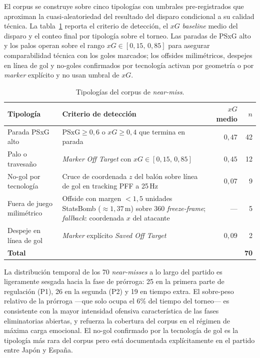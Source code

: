El corpus se construye sobre cinco tipologías con umbrales
pre-registrados que aproximan la cuasi-aleatoriedad del resultado
del disparo condicional a su calidad técnica. La
tabla~\ref{tab:nearmiss-tipos} reporta el criterio de detección, el
$xG$ \textit{baseline} medio del disparo y el conteo final por
tipología sobre el torneo. Las paradas de PSxG alto y los palos
operan sobre el rango $xG \in [0{,}15,\, 0{,}85]$ para asegurar
comparabilidad técnica con los goles marcados; los offsides
milimétricos, despejes en línea de gol y no-goles confirmados por
tecnología activan por geometría o por \textit{marker} explícito y
no usan umbral de $xG$.

\begin{table}[h]
  \centering
  \footnotesize
  \caption{Tipologías del corpus de \textit{near-miss}.}
  \label{tab:nearmiss-tipos}
  \begin{tabular}{@{}lp{6.0cm}rr@{}}
    \toprule
    Tipología & Criterio de detección & $xG$ medio & $n$ \\
    \midrule
    Parada PSxG alto         & $\text{PSxG} \geq 0{,}6$ o $xG \geq 0{,}4$ que termina en parada & $0{,}47$ & 42 \\
    Palo o travesaño         & \textit{Marker} \textit{Off Target} con $xG \in [0{,}15,\, 0{,}85]$ & $0{,}45$ & 12 \\
    No-gol por tecnología    & Cruce de coordenada $z$ del balón sobre línea de gol en tracking PFF a 25\,Hz & $0{,}07$ & 9 \\
    Fuera de juego milimétrico & Offside con margen $< 1{,}5$ unidades StatsBomb ($\approx 1{,}37$\,m) sobre 360 \textit{freeze-frame}; \textit{fallback}: coordenada $x$ del atacante & --- & 5 \\
    Despeje en línea de gol  & \textit{Marker} explícito \textit{Saved Off Target} & $0{,}09$ & 2 \\
    \midrule
    \textbf{Total}           &                                       &          & \textbf{70} \\
    \bottomrule
  \end{tabular}
\end{table}

La distribución temporal de los 70 \textit{near-misses} a lo largo
del partido es ligeramente sesgada hacia la fase de prórroga: 25 en
la primera parte de regulación (P1), 26 en la segunda (P2) y 19 en
tiempo extra. El sobre-peso relativo de la prórroga ---que solo
ocupa el 6\% del tiempo del torneo--- es consistente con la mayor
intensidad ofensiva característica de las fases eliminatorias
abiertas, y refuerza la cobertura del corpus en el régimen de
máxima carga emocional. El no-gol confirmado por la tecnología de
gol es la tipología más rara del corpus pero está documentada
explícitamente en el partido entre Japón y España.


